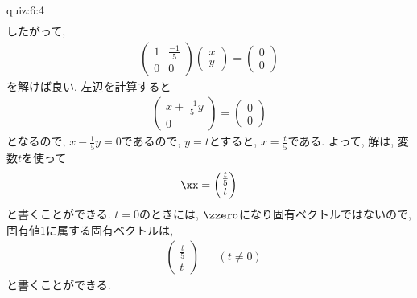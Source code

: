 \begin{answerof}{quiz:6:4}
\begin{align*}
  \end{align*}
 したがって,
  \begin{align*}
    \begin{pmatrix}1&\frac{-1}{5}\\0&0\end{pmatrix}
      \begin{pmatrix}x\\y\end{pmatrix}
=
    \begin{pmatrix}0\\0\end{pmatrix}
  \end{align*}
  を解けば良い.
  左辺を計算すると
  \begin{align*}
    \begin{pmatrix}x+\frac{-1}{5}y\\0\end{pmatrix}=
      \begin{pmatrix}0\\0\end{pmatrix}
  \end{align*}
  となるので,
   $x-\frac{1}{5}y=0$であるので,
  $y=t$とすると, $x=\frac{t}{5}$である.
  よって, 解は, 変数$t$を使って
  \begin{align*}
    \xx=\begin{pmatrix}\frac{t}{5}\\t\end{pmatrix} 
  \end{align*}
  と書くことができる.
  $t=0$のときには, $\zzero$になり固有ベクトルではないので,
  固有値$1$に属する固有ベクトルは,
  \begin{align*}
    &\begin{pmatrix}\frac{t}{5}\\t\end{pmatrix}
       &&(t\neq 0)
  \end{align*}
  と書くことができる.


\end{answerof}
